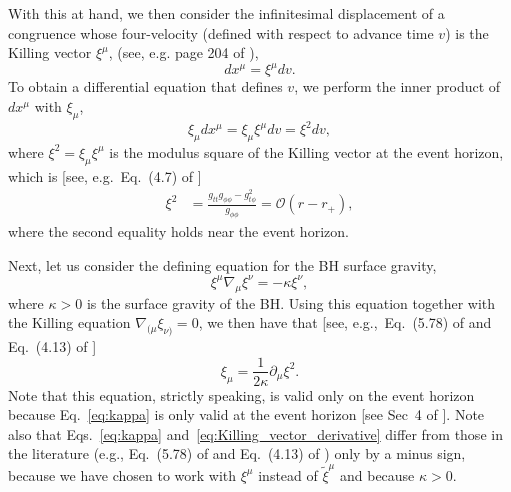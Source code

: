 \documentclass[aps,prx,amsmath,floats,floatfix,twocolumn,
  superscriptaddress,nofootinbib,showpacs]{revtex4-1}
\begin{document}
With this at hand, we then consider the infinitesimal displacement of a congruence whose four-velocity (defined with respect to advance time $v$) is the Killing vector $\xi^{\mu}$, (see, e.g. page 204 of \cite{Poisson:2009pwt}), 
\begin{equation}\label{eq:adv_time_def}
dx^{\mu} = \xi^{\mu} d v. 
\end{equation}
To obtain a differential equation that defines $v$, we perform the inner product of $dx^{\mu}$ with $\xi_{\mu}$, 
\begin{equation}\label{eq:Killing_displacement}
\xi_{\mu} dx^{\mu} = \xi_{\mu} \xi^{\mu} d v = \xi^2 d v, 
\end{equation}
where $\xi^2 = \xi_{\mu} \xi^{\mu} $ is the modulus square of the Killing vector at the event horizon, which is [see, e.g.~Eq.~(4.7) of \cite{Cano_Ruiperez_2019}]
\begin{equation} \label{eq:xi_sq}
\begin{split}
\xi^2 & = \frac{g_{tt} g_{\phi \phi} - g_{t \phi}^2}{g_{\phi \phi}} = \mathcal{O}(r-r_+),  
\end{split}
\end{equation}
where the second equality holds near the event horizon. 

Next, let us consider the defining equation for the BH surface gravity, 
\begin{equation}\label{eq:kappa}
\xi^{\mu}\nabla_{\mu} \xi^{\nu} = - \kappa \xi^{\nu}, 
\end{equation}
where $\kappa > 0 $ is the surface gravity of the BH. Using this equation together with the Killing equation $\nabla_{(\mu} \xi_{\nu)} = 0$, we then have that [see, e.g.,~Eq.~(5.78) of \cite{Poisson:2009pwt} and Eq.~(4.13) of \cite{Cano_Ruiperez_2019}]
\begin{equation}\label{eq:Killing_vector_derivative}
\xi_{\mu} = \frac{1}{2 \kappa} \partial_{\mu} \xi^2. 
\end{equation}
Note that this equation, strictly speaking, is valid only on the event horizon because Eq.~\eqref{eq:kappa} is only valid at the event horizon [see Sec~4 of \cite{Cano_Ruiperez_2019}]. 
Note also that Eqs.~\eqref{eq:kappa} and~\eqref{eq:Killing_vector_derivative} differ from those in the literature (e.g., Eq.~(5.78) of \cite{Poisson:2009pwt} and Eq.~(4.13) of \cite{Cano_Ruiperez_2019}) only by a minus sign, because we have chosen to work with $\xi^{\mu}$ instead of $\tilde{\xi}^{\mu}$ and because $\kappa > 0$. 
\end{document}
